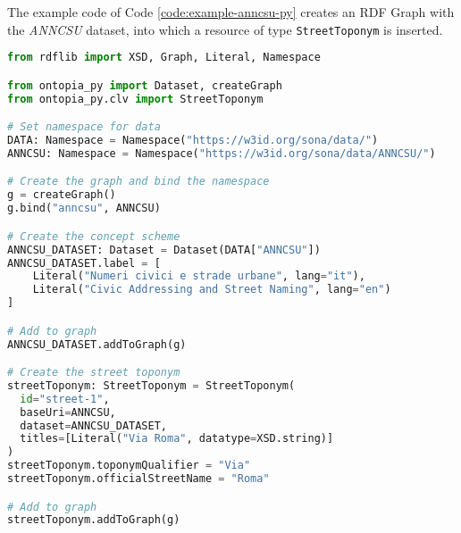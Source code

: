 The example code of Code \ref{code:example-anncsu-py} creates an \ac{RDF} Graph with the \textit{ANNCSU} dataset, into which a resource of type \verb#StreetToponym# is inserted.

\begin{lstlisting}[language=python,caption={An example of the creation of an RDF Graph with the ontoim-py and ontopia-py libraries.},label=code:example-anncsu-py]
from rdflib import XSD, Graph, Literal, Namespace

from ontopia_py import Dataset, createGraph
from ontopia_py.clv import StreetToponym

# Set namespace for data
DATA: Namespace = Namespace("https://w3id.org/sona/data/")
ANNCSU: Namespace = Namespace("https://w3id.org/sona/data/ANNCSU/")

# Create the graph and bind the namespace
g = createGraph()
g.bind("anncsu", ANNCSU)

# Create the concept scheme
ANNCSU_DATASET: Dataset = Dataset(DATA["ANNCSU"])
ANNCSU_DATASET.label = [
    Literal("Numeri civici e strade urbane", lang="it"),
    Literal("Civic Addressing and Street Naming", lang="en")
]

# Add to graph
ANNCSU_DATASET.addToGraph(g)

# Create the street toponym
streetToponym: StreetToponym = StreetToponym(
  id="street-1",
  baseUri=ANNCSU,
  dataset=ANNCSU_DATASET,
  titles=[Literal("Via Roma", datatype=XSD.string)]
)
streetToponym.toponymQualifier = "Via"
streetToponym.officialStreetName = "Roma"

# Add to graph
streetToponym.addToGraph(g)
\end{lstlisting}